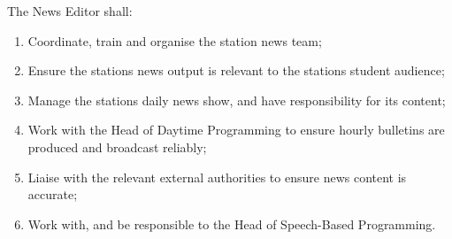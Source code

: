 \item The News Editor shall:
\begin{enumerate}[label*=\arabic*.]
    \item Coordinate, train and organise the station news team;
    \item Ensure the stations news output is relevant to the stations student audience;
    \item Manage the stations daily news show, and have responsibility for its content;
    \item Work with the Head of Daytime Programming to ensure hourly bulletins are produced and broadcast reliably;
    \item Liaise with the relevant external authorities to ensure news content is accurate;
    \item Work with, and be responsible to the Head of Speech-Based Programming.
\end{enumerate}
